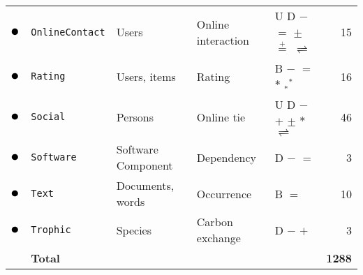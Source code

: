 \begin{tabular}{lllllr}
\textcolor{colorOnlineContact}{$\newmoon$} &\texttt{OnlineContact} & Users & Online interaction & U D \phantom{B} $-$ $=$ \phantom{$+$} $\pm$ $\stackrel{+}{=}$ \phantom{$*$} \phantom{$_*{}^*$} $\rightleftharpoons$ \phantom{$++$}  &  15\\
\textcolor{colorRating}{$\newmoon$} &\texttt{Rating} & Users, items & Rating & \phantom{U} \phantom{D} B $-$ $=$ \phantom{$+$} \phantom{$\pm$} \phantom{$\stackrel{+}{=}$} $*$ $_*{}^*$ \phantom{$\rightleftharpoons$} \phantom{$++$}  &  16\\
\textcolor{colorSocial}{$\newmoon$} &\texttt{Social} & Persons & Online tie & U D \phantom{B} $-$ \phantom{$=$} $+$ $\pm$ \phantom{$\stackrel{+}{=}$} $*$ \phantom{$_*{}^*$} $\rightleftharpoons$ \phantom{$++$}  &  46\\
\textcolor{colorSoftware}{$\newmoon$} &\texttt{Software} & Software Component & Dependency & \phantom{U} D \phantom{B} $-$ $=$ \phantom{$+$} \phantom{$\pm$} \phantom{$\stackrel{+}{=}$} \phantom{$*$} \phantom{$_*{}^*$} \phantom{$\rightleftharpoons$} \phantom{$++$}  &  3\\
\textcolor{colorText}{$\newmoon$} &\texttt{Text} & Documents, words & Occurrence & \phantom{U} \phantom{D} B \phantom{$-$} $=$ \phantom{$+$} \phantom{$\pm$} \phantom{$\stackrel{+}{=}$} \phantom{$*$} \phantom{$_*{}^*$} \phantom{$\rightleftharpoons$} \phantom{$++$}  &  10\\
\textcolor{colorTrophic}{$\newmoon$} &\texttt{Trophic} & Species & Carbon exchange & \phantom{U} D \phantom{B} $-$ \phantom{$=$} $+$ \phantom{$\pm$} \phantom{$\stackrel{+}{=}$} \phantom{$*$} \phantom{$_*{}^*$} \phantom{$\rightleftharpoons$} \phantom{$++$}  &  3\\
\midrule
& \textbf{Total} &&&& \textbf{1288}\\
\bottomrule
\end{tabular}
